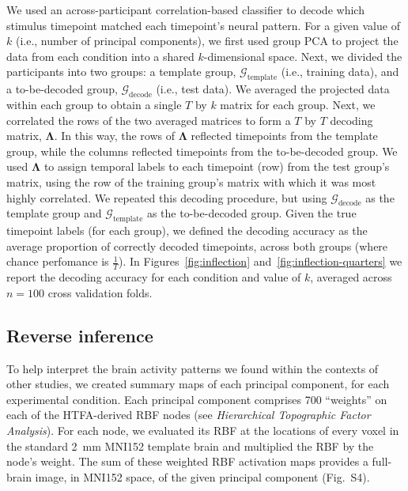\documentclass[english, 11pt]{article}
\newcommand{\componentBrains}{S4} %
\begin{document}
We used an across-participant correlation-based classifier to decode which
stimulus timepoint matched each timepoint's neural pattern. For a given value
of $k$ (i.e., number of principal components), we first used group PCA to
project the data from each condition into a shared $k$-dimensional space. Next,
we divided the participants into two groups: a template group,
$\mathcal{G}_{\mathrm{template}}$ (i.e., training data), and a to-be-decoded
group, $\mathcal{G}_{\mathrm{decode}}$ (i.e., test data). We averaged the
projected data within each group to obtain a single $T$ by $k$ matrix for each
group. Next, we correlated the rows of the two averaged matrices to form a $T$
by $T$ decoding matrix, $\mathbf{\Lambda}$. In this way, the rows of
$\mathbf{\Lambda}$ reflected timepoints from the template group, while the
columns reflected timepoints from the to-be-decoded group. We used
$\mathbf{\Lambda}$ to assign temporal labels to each timepoint (row) from the
test group's matrix, using the row of the training group's matrix with which it
was most highly correlated. We repeated this decoding procedure, but using
$\mathcal{G}_{\mathrm{decode}}$ as the template group and
$\mathcal{G}_{\mathrm{template}}$ as the to-be-decoded group. Given the true
timepoint labels (for each group), we defined the decoding accuracy as the
average proportion of correctly decoded timepoints, across both groups (where
chance perfomance is $\frac{1}{T}$). In Figures~\ref{fig:inflection}
and~\ref{fig:inflection-quarters} we report the decoding accuracy for each
condition and value of $k$, averaged across $n = 100$ cross validation folds.

\subsection*{Reverse inference}

To help interpret the brain activity patterns we found within the contexts of
other studies, we created summary maps of each principal component, for each
experimental condition. Each principal component comprises 700 ``weights'' on
each of the HTFA-derived RBF nodes (see \textit{Hierarchical Topographic Factor
Analysis}). For each node, we evaluated its RBF at the locations of every voxel
in the standard 2~mm MNI152 template brain and multiplied the RBF by the node's
weight. The sum of these weighted RBF activation maps provides a full-brain
image, in MNI152 space, of the given principal component (Fig.~\componentBrains).
\end{document}

